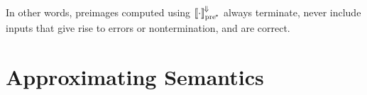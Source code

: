 \documentclass{llncs}
\newcommand{\conv}{^{\mspace{-2mu}\Downarrow\mspace{-2mu}}}
\newcommand{\meaningofconv}[1]{\left\llbracket{#1}\right\rrbracket\conv}
\newcommand{\ppre}{_\mathrm{pre^{\mspace{-2mu}*}}}
\begin{document}
In other words, preimages computed using $\meaningofconv{\cdot}\ppre$ always terminate, never include inputs that give rise to errors or nontermination, and are correct.


\section{Approximating Semantics}
\label{sec:approximating-semantics}


\end{document}
